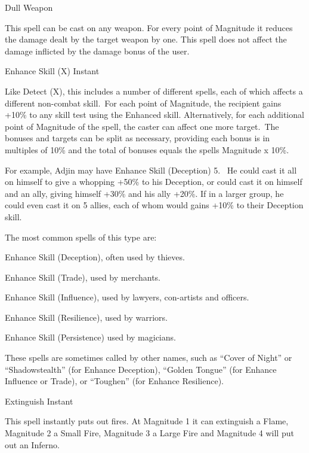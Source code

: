 \begin{rpg-spell}
{Dull Weapon}
{}

This spell can be cast on any weapon. For every point of Magnitude it reduces the damage dealt by the target weapon by one. This spell does not affect the damage inflicted by the damage bonus of the user.
\end{rpg-spell}


\begin{rpg-spell}
{Enhance Skill (X)}
{Instant}

Like Detect (X), this includes a number of different spells, each of which affects a different non-combat skill. For each point of Magnitude, the recipient gains +10\% to any skill test using the Enhanced skill.  Alternatively, for each additional point of Magnitude of the spell, the caster can affect one more target. The bonuses and targets can be split as necessary, providing each bonus is in multiples of 10\% and the total of bonuses equals the spells Magnitude x 10\%.

For example, Adjin may have Enhance Skill (Deception) 5.  He could cast it all on himself to give a whopping +50\% to his Deception, or could cast it on himself and an ally, giving himself +30\% and his ally +20\%. If in a larger group, he could even cast it on 5 allies, each of whom would gains +10\% to their Deception skill.

The most common spells of this type are:
\begin{rpg-list}
\item Enhance Skill (Deception), often used by thieves.
\item Enhance Skill (Trade), used by merchants.
\item Enhance Skill (Influence), used by lawyers, con-artists and officers.
\item Enhance Skill (Resilience), used by warriors.
\item Enhance Skill (Persistence) used by magicians.
\end{rpg-list}

These spells are sometimes called by other names, such as “Cover of Night” or “Shadowstealth” (for Enhance Deception), “Golden Tongue” (for Enhance Influence or Trade), or “Toughen” (for Enhance Resilience).
\end{rpg-spell}


\begin{rpg-spell}
{Extinguish}
{Instant}

This spell instantly puts out fires. At Magnitude 1 it can extinguish a Flame, Magnitude 2 a Small Fire, Magnitude 3 a Large Fire and Magnitude 4 will put out an Inferno.
\end{rpg-spell}



